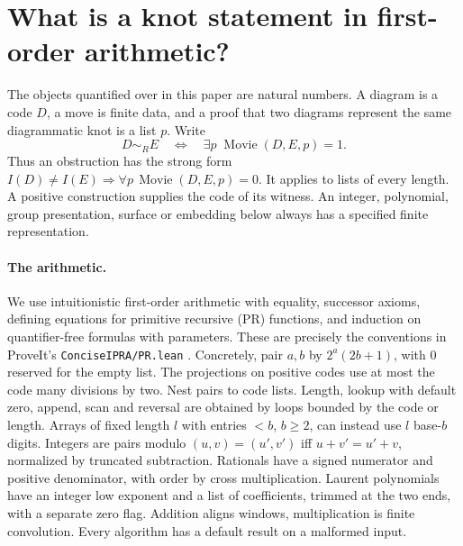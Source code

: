 \section{What is a knot statement in first-order arithmetic?}
The objects quantified over in this paper are natural numbers. A diagram is a code $D$, a move is finite data, and a proof that two diagrams represent the same diagrammatic knot is a list $p$. Write
\[
 D\sim_R E\quad\Longleftrightarrow\quad \exists p\;\operatorname{Movie}(D,E,p)=1.
\]
Thus an obstruction has the strong form $I(D)\ne I(E)\Rightarrow
\forall p\,\operatorname{Movie}(D,E,p)=0$. It applies to lists of every length.
A positive construction supplies the code of its witness. An integer, polynomial, group presentation, surface or embedding below always has a specified finite representation.

\paragraph{The arithmetic.}
We use intuitionistic first-order arithmetic with equality, successor axioms, defining equations for primitive recursive (PR) functions, and induction on quantifier-free formulas with parameters. These are precisely the conventions in ProveIt's \texttt{ConciseIPRA/PR.lean} \cite{proveit}. Concretely, pair $a,b$ by $2^a(2b+1)$, with $0$ reserved for the empty list. The projections on positive codes use at most the code many divisions by two. Nest pairs to code lists. Length, lookup with default zero, append, scan and reversal are obtained by loops bounded by the code or length. Arrays of fixed length $l$ with entries $<b$, $b\ge2$, can instead use $l$ base-$b$ digits. Integers are pairs modulo $(u,v)=(u',v')$ iff $u+v'=u'+v$, normalized by truncated subtraction. Rationals have a signed numerator and positive denominator, with order by cross multiplication. Laurent polynomials have an integer low exponent and a list of coefficients, trimmed at the two ends, with a separate zero flag. Addition aligns windows, multiplication is finite convolution. Every algorithm has a default result on a malformed input.

